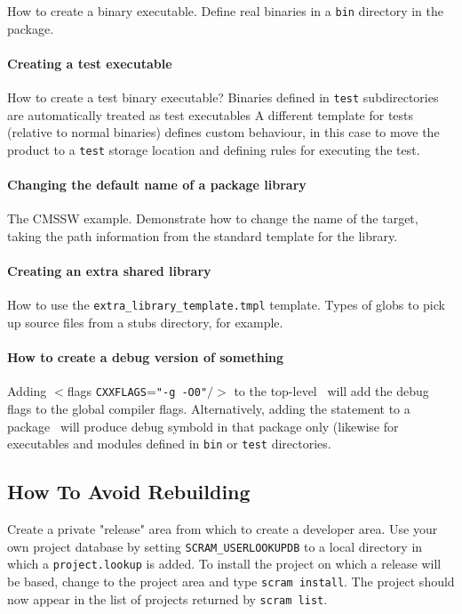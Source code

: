 How to create a binary executable. Define real binaries in a
\texttt{bin} directory in the package.

\paragraph{Creating a test executable}

How to create a test binary executable? Binaries defined in
\texttt{test} subdirectories are automatically treated as test executables
A different template for tests (relative to normal binaries) defines custom behaviour, in this
case to move the product to a \texttt{test} storage location and defining rules for executing the test. 

\paragraph{Changing the default name of a package library}

The CMSSW example. Demonstrate how to change the name of the target,
taking the path information from the standard template for the library.

\paragraph{Creating an extra shared library}

How to use the \texttt{extra\_library\_template.tmpl} template. Types of globs
to pick up source files from a stubs directory, for example.

\paragraph{How to create a debug version of something}

Adding $<$flags \texttt{CXXFLAGS}=\texttt{"-g -O0"}$/>$ to the top-level
\buildfile\ will add the debug flags to the global compiler
flags. Alternatively, adding the statement to a package \buildfile\
will produce debug symbold in that package only (likewise for
executables and modules defined in \texttt{bin} or \texttt{test} directories.

\subsection{How To Avoid Rebuilding}

Create a private "release" area from which to create
a developer area. Use your own project database by setting
\texttt{SCRAM\_USERLOOKUPDB} to a local directory in which a
\texttt{project.lookup} is added. 
To install the project on which a release will be based, change to the
project area and type \texttt{scram install}. The project should now
appear in the list of projects returned by \texttt{scram list}.

